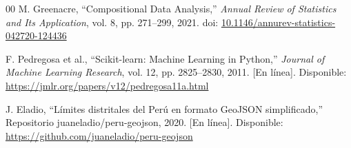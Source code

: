 \documentclass[conference,10pt,letterpaper]{IEEEtran}
\begin{document}
\begin{thebibliography}{00}
 M. Greenacre, ``Compositional Data Analysis,'' \textit{Annual Review of Statistics and Its Application}, vol. 8, pp. 271--299, 2021. doi: \href{https://doi.org/10.1146/annurev-statistics-042720-124436}{10.1146/annurev-statistics-042720-124436}

 F. Pedregosa et al., ``Scikit-learn: Machine Learning in Python,'' \textit{Journal of Machine Learning Research}, vol. 12, pp. 2825--2830, 2011. [En línea]. Disponible: \url{https://jmlr.org/papers/v12/pedregosa11a.html}

 J. Eladio, ``Límites distritales del Perú en formato GeoJSON simplificado,'' Repositorio juaneladio/peru-geojson, 2020. [En línea]. Disponible: \url{https://github.com/juaneladio/peru-geojson}

\end{thebibliography}
\end{document}
